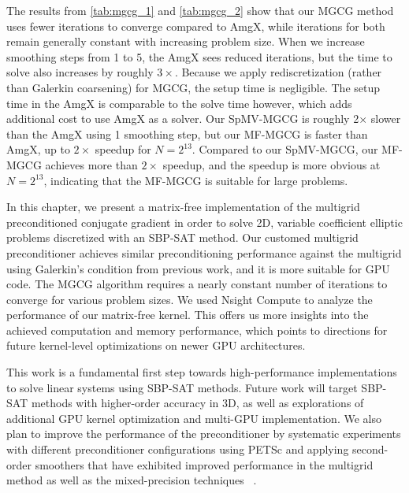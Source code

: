 The results from \autoref{tab:mgcg_1} and \autoref{tab:mgcg_2} show that our MGCG method uses fewer iterations to converge compared to AmgX, while iterations for both remain generally constant with increasing problem size. When we increase smoothing steps from 1 to 5, the AmgX sees reduced iterations, but the time to solve also increases by roughly $3\times$.
Because we apply rediscretization (rather than Galerkin coarsening) for MGCG, the setup time is negligible.
The setup time in the AmgX is comparable to the solve time however, which adds additional cost to use AmgX as a solver.
Our SpMV-MGCG is roughly 2$\times$ slower than the AmgX using 1 smoothing step, but our MF-MGCG is faster than AmgX, up to $2\times$ speedup for $N = 2^{13}$.
Compared to our SpMV-MGCG, our MF-MGCG achieves more than $2\times$ speedup, and the speedup is more obvious at $N=2^{13}$, indicating that the MF-MGCG is suitable for large problems.


In this chapter, we present a matrix-free implementation of the multigrid preconditioned conjugate gradient in order to solve 2D, variable coefficient elliptic problems discretized with an SBP-SAT method.
Our customed multigrid preconditioner achieves similar preconditioning performance against the multigrid using Galerkin's condition from previous work, and it is more suitable for GPU code.
The MGCG algorithm requires a nearly constant number of iterations to converge for various problem sizes. 
We used Nsight Compute to analyze the performance of our matrix-free kernel. This offers us more insights into the achieved computation and memory performance, which points to directions for future kernel-level optimizations on newer GPU architectures.

This work is a fundamental first step towards high-performance implementations to solve linear systems using SBP-SAT methods. Future work will target SBP-SAT methods with higher-order accuracy in 3D, as well as explorations of additional GPU kernel optimization and multi-GPU implementation. We also plan to improve the performance of the preconditioner by systematic experiments with different preconditioner configurations using PETSc and applying second-order smoothers that have exhibited improved performance in the multigrid method as well as the mixed-precision techniques ~\cite{golub1961chebyshev,gutknecht2002chebyshev,abdelfattah2021survey}.